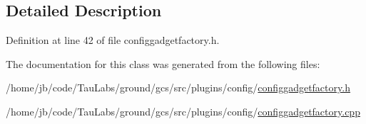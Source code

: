 \subsection{\-Detailed \-Description}


\-Definition at line 42 of file configgadgetfactory.\-h.



\-The documentation for this class was generated from the following files\-:\begin{DoxyCompactItemize}
\item 
/home/jb/code/\-Tau\-Labs/ground/gcs/src/plugins/config/\hyperlink{configgadgetfactory_8h}{configgadgetfactory.\-h}\item 
/home/jb/code/\-Tau\-Labs/ground/gcs/src/plugins/config/\hyperlink{configgadgetfactory_8cpp}{configgadgetfactory.\-cpp}\end{DoxyCompactItemize}
